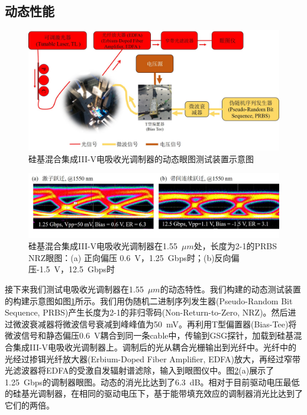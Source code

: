 \subsection{动态性能}
\begin{figure}[htb]
	\centering
	\includegraphics[width=15cm]{./Pictures/chapt4_dynamic_measure_setup.jpg}
	\caption{硅基混合集成III-V电吸收光调制器的动态眼图测试装置示意图}
	\label{chapt4_dynamic_measure_setup}
\end{figure}
\begin{figure}[htb]
	\centering
	\includegraphics[width=15cm]{./Pictures/chapt4_eyediagram.jpg}
	\caption{硅基混合集成III-V电吸收光调制器在1.55~$\mu m$处，长度为2-1的PRBS NRZ眼图：(a) 正向偏压 0.6~V，1.25~Gbps时；(b)反向偏压-1.5~V，12.5~Gbps时}
	\label{chapt4_eyediagram}
\end{figure}
接下来我们测试电吸收光调制器在1.55~$\mu m$的动态特性。我们构建的动态测试装置的构建示意图如图\ref{chapt4_dynamic_measure_setup}所示。我们用伪随机二进制序列发生器(Pseudo-Random Bit Sequence, PRBS)产生长度为2-1的非归零码(Non-Return-to-Zero, NRZ)。然后进过微波衰减器将微波信号衰减到峰峰值为50~mV。再利用T型偏置器(Bias-Tee)将微波信号和静态偏压0.6~V耦合到同一条cable中，传输到GSG探针，加载到硅基混合集成III-V电吸收光调制器上。调制后的光从耦合光栅输出到光纤中。光纤中的光经过掺铒光纤放大器(Erbium-Doped Fiber Amplifier, EDFA)放大，再经过窄带光滤波器将EDFA的受激自发辐射谱滤除，输入到眼图仪中。图\ref{chapt4_eyediagram}(a)展示了1.25~Gbps的调制器眼图。动态的消光比达到了6.3~dB。相对于目前驱动电压最低的硅基光调制器，在相同的驱动电压下，基于能带填充效应的调制器消光比达到了它们的两倍。

